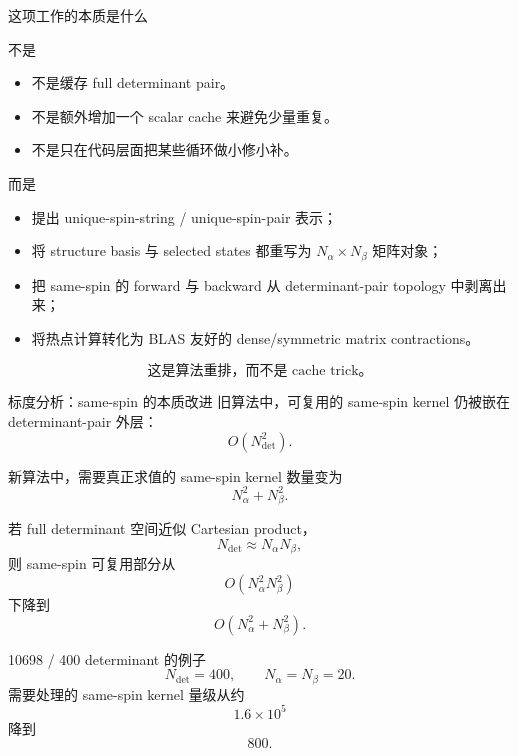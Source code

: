 \documentclass[aspectratio=169,professionalfonts]{ctexbeamer}
\newcommand{\Dfull}{N_{\mathrm{det}}}
\newcommand{\Na}{N_{\alpha}}
\newcommand{\Nb}{N_{\beta}}
\begin{document}
\begin{frame}{这项工作的本质是什么}
  \small
  \begin{block}{不是}
    \begin{itemize}
      \item 不是缓存 full determinant pair。
      \item 不是额外增加一个 scalar cache 来避免少量重复。
      \item 不是只在代码层面把某些循环做小修小补。
    \end{itemize}
  \end{block}

  \begin{block}{而是}
    \begin{itemize}
      \item 提出 unique-spin-string / unique-spin-pair 表示；
      \item 将 structure basis 与 selected states 都重写为 \(\Na\times\Nb\) 矩阵对象；
      \item 把 same-spin 的 forward 与 backward 从 determinant-pair topology 中剥离出来；
      \item 将热点计算转化为 BLAS 友好的 dense/symmetric matrix contractions。
    \end{itemize}
  \end{block}

  \[
  \boxed{
    \text{这是算法重排，而不是 cache trick。}
  }
  \]
\end{frame}

\begin{frame}{标度分析：same-spin 的本质改进}
  \small
  旧算法中，可复用的 same-spin kernel 仍被嵌在 determinant-pair 外层：
  \[
  O(\Dfull^2).
  \]

  新算法中，需要真正求值的 same-spin kernel 数量变为
  \[
  \Na^2 + \Nb^2.
  \]

  若 full determinant 空间近似 Cartesian product，
  \[
  \Dfull \approx \Na \Nb,
  \]
  则 same-spin 可复用部分从
  \[
  O(\Na^2 \Nb^2)
  \]
  下降到
  \[
  O(\Na^2 + \Nb^2).
  \]

  \begin{block}{10698 / 400 determinant 的例子}
    \[
    \Dfull = 400,\qquad \Na = \Nb = 20.
    \]
    需要处理的 same-spin kernel 量级从约
    \[
    1.6\times 10^5
    \]
    降到
    \[
    800.
    \]
  \end{block}
\end{frame}
\end{document}
